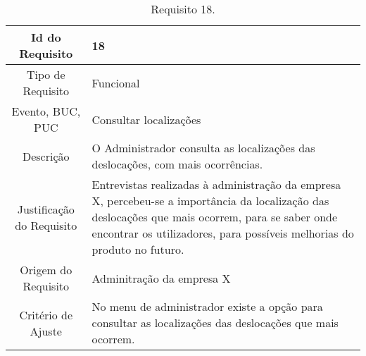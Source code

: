\begin{table}[H]
\begin{center}
  \begin{tabularx}{\textwidth}{ | c | X | }
    \hline
    Id do Requisito & 18  \\
    
    \hline
    Tipo de Requisito & Funcional \\
    
    \hline
    Evento, BUC, PUC &  Consultar localizações\\
    
    \hline
    Descrição & O Administrador consulta as localizações das deslocações, com mais ocorrências.\\
    
    \hline
    Justificação do Requisito & Entrevistas realizadas à administração da empresa X, percebeu-se a importância da localização das deslocações que mais ocorrem, para se saber onde encontrar os utilizadores, para possíveis melhorias do produto no futuro. \\
    
    \hline
    Origem do Requisito & Adminitração da empresa X\\
    
    \hline
    Critério de Ajuste & No menu de administrador existe a opção para consultar as localizações das deslocações que mais ocorrem.  \\
    
    \hline
  \end{tabularx}
  \caption{Requisito 18.} \label{tab:r3}
\end{center}
\end{table}

